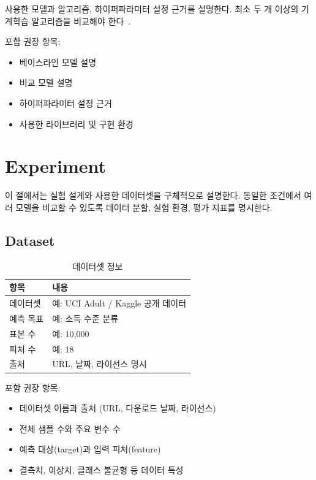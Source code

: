 \documentclass[10pt,a4paper,twocolumn]{article}
\begin{document}
사용한 모델과 알고리즘, 하이퍼파라미터 설정 근거를 설명한다. 최소 두 개 이상의
기계학습 알고리즘을 비교해야 한다~\cite{pedregosa2011scikit}.

포함 권장 항목:
\begin{itemize}
  \item 베이스라인 모델 설명
  \item 비교 모델 설명
  \item 하이퍼파라미터 설정 근거
  \item 사용한 라이브러리 및 구현 환경
\end{itemize}

\section{Experiment}

이 절에서는 실험 설계와 사용한 데이터셋을 구체적으로 설명한다. 동일한 조건에서
여러 모델을 비교할 수 있도록 데이터 분할, 실험 환경, 평가 지표를 명시한다.

\subsection{Dataset}

\begin{table}[h]
\vspace{-4pt}
\centering
\footnotesize
\setlength{\tabcolsep}{3pt}
\caption{데이터셋 정보}
\begin{tabularx}{\columnwidth}{@{}p{15mm}X@{}}
\toprule
항목 & 내용 \\
\midrule
데이터셋 & 예: UCI Adult / Kaggle 공개 데이터 \\
예측 목표 & 예: 소득 수준 분류 \\
표본 수 & 예: 10{,}000 \\
피처 수 & 예: 18 \\
출처 & URL, 날짜, 라이선스 명시 \\
\bottomrule
\end{tabularx}
\vspace{-4pt}
\end{table}

포함 권장 항목:
\begin{itemize}
  \item 데이터셋 이름과 출처 (URL, 다운로드 날짜, 라이선스)~\cite{dua2019uci}
  \item 전체 샘플 수와 주요 변수 수
  \item 예측 대상(target)과 입력 피처(feature)
  \item 결측치, 이상치, 클래스 불균형 등 데이터 특성
\end{itemize}
\end{document}
